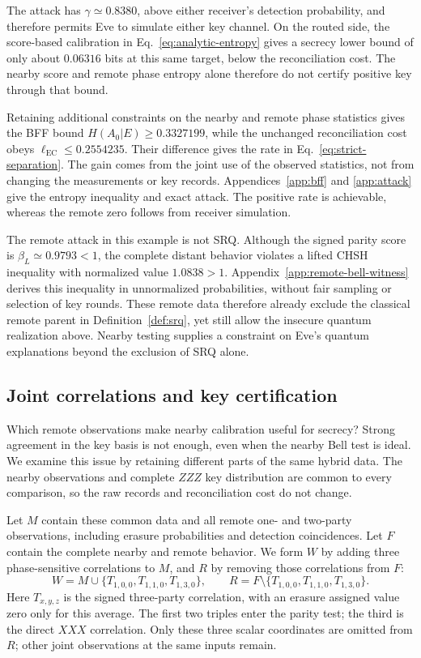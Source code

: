 \documentclass[aps,10pt,onecolumn,prx,superscriptaddress,longbibliography,nofootinbib]{revtex4-2}
\newcommand{\EC}{\ell_{\mathrm{EC}}}
\begin{document}
The attack has \(\gamma\simeq0.8380\), above either receiver's detection probability, and therefore permits Eve to simulate either key channel. On the routed side, the score-based calibration in Eq.~\eqref{eq:analytic-entropy} gives a secrecy lower bound of only about \(0.06316\) bits at this same target, below the reconciliation cost. The nearby score and remote phase entropy alone therefore do not certify positive key through that bound.

Retaining additional constraints on the nearby and remote phase statistics gives the BFF bound \(H(A_0|E)\geq0.3327199\), while the unchanged reconciliation cost obeys \(\EC\leq0.2554235\). Their difference gives the rate in Eq.~\eqref{eq:strict-separation}. The gain comes from the joint use of the observed statistics, not from changing the measurements or key records. Appendices~\ref{app:bff} and \ref{app:attack} give the entropy inequality and exact attack. The positive rate is achievable, whereas the remote zero follows from receiver simulation.

The remote attack in this example is not SRQ. Although the signed parity score is \(\beta_L\simeq0.9793<1\), the complete distant behavior violates a lifted CHSH inequality with normalized value \(1.0838>1\). Appendix~\ref{app:remote-bell-witness} derives this inequality in unnormalized probabilities, without fair sampling or selection of key rounds. These remote data therefore already exclude the classical remote parent in Definition~\ref{def:srq}, yet still allow the insecure quantum realization above. Nearby testing supplies a constraint on Eve's quantum explanations beyond the exclusion of SRQ alone.

\subsection{Joint correlations and key certification}\label{sec:mwrf}

Which remote observations make nearby calibration useful for secrecy? Strong agreement in the key basis is not enough, even when the nearby Bell test is ideal. We examine this issue by retaining different parts of the same hybrid data. The nearby observations and complete \(ZZZ\) key distribution are common to every comparison, so the raw records and reconciliation cost do not change.

Let \(M\) contain these common data and all remote one- and two-party observations, including erasure probabilities and detection coincidences. Let \(F\) contain the complete nearby and remote behavior. We form \(W\) by adding three phase-sensitive correlations to \(M\), and \(R\) by removing those correlations from \(F\):
\begin{equation}
 W=M\cup\{T_{1,0,0},T_{1,1,0},T_{1,3,0}\},\qquad
 R=F\setminus\{T_{1,0,0},T_{1,1,0},T_{1,3,0}\}.
 \label{eq:mwrf}
\end{equation}
Here \(T_{x,y,z}\) is the signed three-party correlation, with an erasure assigned value zero only for this average. The first two triples enter the parity test; the third is the direct \(XXX\) correlation. Only these three scalar coordinates are omitted from \(R\); other joint observations at the same inputs remain.
\end{document}
